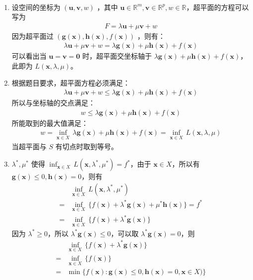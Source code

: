 \documentclass[11pt,letter,notitlepage]{article}
\begin{document}
\newpage
${}$
\begin{solution}
	\heiti
	\begin{enumerate}
		\ \\
		\item 设空间的坐标为 $(\textbf{u}, \textbf{v}, w)$ ，其中 $\textbf{u} \in \mathbb{R}^m, \textbf{v} \in \mathbb{R}^p, w \in \mathbb{R}$，超平面的方程可以写为
		\begin{align*}
			F = \lambda \textbf{u} + \mu \textbf{v} + w
		\end{align*}
		因为超平面过 $(\mathbf{g}(\mathbf{x}),\mathbf{h}(\mathbf{x}),f(\mathbf{x}))$ ，则有：
		\begin{align*}
			\lambda \textbf{u} + \mu \textbf{v} + w = \lambda \mathbf{g}(\mathbf{x}) + \mu \mathbf{h}(\mathbf{x}) + f(\mathbf{x})
		\end{align*}
		可以看出当 $\textbf{u} = \textbf{v} = \textbf{0}$ 时，超平面交坐标轴于 $\lambda \mathbf{g}(\mathbf{x}) + \mu \mathbf{h}(\mathbf{x}) + f(\mathbf{x})$，此即为 $L(\mathbf{x},\lambda,\mu)$。
		\item 根据题目要求，超平面方程必须满足：
		\begin{align*}
			\lambda \textbf{u} + \mu \textbf{v} + w \leqslant \lambda \mathbf{g}(\mathbf{x}) + \mu \mathbf{h}(\mathbf{x}) + f(\mathbf{x})
		\end{align*}
		所以与坐标轴的交点满足：
		\begin{align*}
			w \leqslant \lambda \mathbf{g}(\mathbf{x}) + \mu \mathbf{h}(\mathbf{x}) + f(\mathbf{x})
		\end{align*}
		所能取到的最大值满足：
		\begin{align*}
			w = \inf_{\mathbf{x}\in X}\, \lambda \mathbf{g}(\mathbf{x}) + \mu \mathbf{h}(\mathbf{x}) + f(\mathbf{x}) = \inf_{\mathbf{x}\in X}\,L(\mathbf{x},\lambda,\mu)
		\end{align*}
		当超平面与 $S$ 有切点时取到等号。
		\item $\lambda^*, \mu^*$ 使得 $\inf_{\mathbf{x}\in X}\,L(\mathbf{x},\lambda^*,\mu^*) = f^*$，由于 $\mathbf{x} \in X$，所以有 $\mathbf{g}(\mathbf{x}) \leqslant 0, \mathbf{h}(\mathbf{x}) = 0$，则有
		\begin{align*}
			&\inf_{\mathbf{x}\in X}\,L(\mathbf{x},\lambda^*,\mu^*)\\
			= &\inf_{\mathbf{x}\in X}\,\{f(\mathbf{x})+\lambda^* \mathbf{g}(\mathbf{x})+\mu^* \mathbf{h}(\mathbf{x})\} = f^*\\
			= &\inf_{\mathbf{x}\in X}\,\{f(\mathbf{x})+\lambda^* \mathbf{g}(\mathbf{x})\}
		\end{align*}
		因为 $\lambda^* \geqslant 0$，所以 $\lambda^* \mathbf{g}(\mathbf{x}) \leqslant 0$，可以取 $\lambda^* \mathbf{g}(\mathbf{x}) = 0$，则
		\begin{align*}
			&\inf_{\mathbf{x}\in X}\,\{f(\mathbf{x})+\lambda^* \mathbf{g}(\mathbf{x})\} \\
			= &\inf_{\mathbf{x}\in X}\,\{f(\mathbf{x})\}\\
			= &\min\{f(\mathbf{x}):\mathbf{g}(\mathbf{x})\leq0,\mathbf{h}(\mathbf{x})=0,\mathbf{x}\in X)\}
		\end{align*}
	\end{enumerate}
\end{solution}
\end{document}
